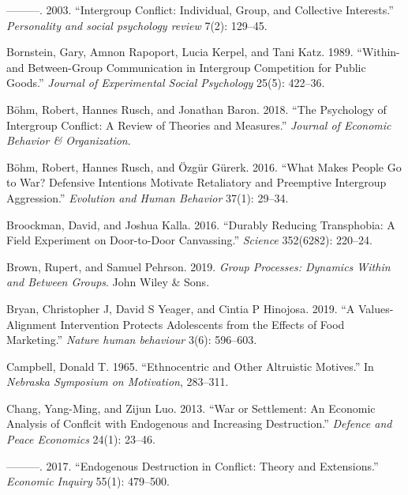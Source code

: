 \documentclass[11pt]{article}
\begin{document}
\leavevmode\hypertarget{ref-bornstein2003intergroup}{}%
---------. 2003. ``Intergroup Conflict: Individual, Group, and
Collective Interests.'' \emph{Personality and social psychology review}
7(2): 129--45.

\leavevmode\hypertarget{ref-bornstein1989within}{}%
Bornstein, Gary, Amnon Rapoport, Lucia Kerpel, and Tani Katz. 1989.
``Within-and Between-Group Communication in Intergroup Competition for
Public Goods.'' \emph{Journal of Experimental Social Psychology} 25(5):
422--36.

\leavevmode\hypertarget{ref-bohm2018psychology}{}%
Böhm, Robert, Hannes Rusch, and Jonathan Baron. 2018. ``The Psychology
of Intergroup Conflict: A Review of Theories and Measures.''
\emph{Journal of Economic Behavior \& Organization}.

\leavevmode\hypertarget{ref-bohm2016makes}{}%
Böhm, Robert, Hannes Rusch, and Özgür Gürerk. 2016. ``What Makes People
Go to War? Defensive Intentions Motivate Retaliatory and Preemptive
Intergroup Aggression.'' \emph{Evolution and Human Behavior} 37(1):
29--34.

\leavevmode\hypertarget{ref-broockman2016durably}{}%
Broockman, David, and Joshua Kalla. 2016. ``Durably Reducing
Transphobia: A Field Experiment on Door-to-Door Canvassing.''
\emph{Science} 352(6282): 220--24.

\leavevmode\hypertarget{ref-brown2019group}{}%
Brown, Rupert, and Samuel Pehrson. 2019. \emph{Group Processes: Dynamics
Within and Between Groups}. John Wiley \& Sons.

\leavevmode\hypertarget{ref-bryan2019values}{}%
Bryan, Christopher J, David S Yeager, and Cintia P Hinojosa. 2019. ``A
Values-Alignment Intervention Protects Adolescents from the Effects of
Food Marketing.'' \emph{Nature human behaviour} 3(6): 596--603.

\leavevmode\hypertarget{ref-campbell1965ethno}{}%
Campbell, Donald T. 1965. ``Ethnocentric and Other Altruistic Motives.''
In \emph{Nebraska Symposium on Motivation}, 283--311.

\leavevmode\hypertarget{ref-chang2013war}{}%
Chang, Yang-Ming, and Zijun Luo. 2013. ``War or Settlement: An Economic
Analysis of Conflcit with Endogenous and Increasing Destruction.''
\emph{Defence and Peace Economics} 24(1): 23--46.

\leavevmode\hypertarget{ref-chang2017endogenous}{}%
---------. 2017. ``Endogenous Destruction in Conflict: Theory and
Extensions.'' \emph{Economic Inquiry} 55(1): 479--500.
\end{document}
